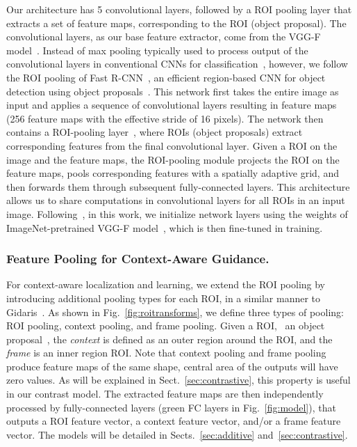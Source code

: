 \documentclass[runningheads]{llncs}
\begin{document}
Our architecture has 5 convolutional layers, followed by a ROI pooling
layer that extracts a set of feature maps, corresponding to the ROI (object
proposal). The convolutional layers, as our base feature extractor, come from
the VGG-F model~\cite{Chatfield14}. 
Instead of max pooling typically used to process output of the convolutional layers in conventional
CNNs for classification~\cite{Krizhevsky:2012wl,Oquab:2015us}, however, we
follow the ROI pooling of Fast R-CNN~\cite{Girshick_2015_ICCV}, an efficient
region-based CNN for object detection using object
proposals~\cite{uijlings2013selective}. This network first takes the
entire image as input and applies a sequence of convolutional layers resulting in feature maps (256 feature maps with the effective stride of 16 pixels). The network then contains a ROI-pooling
layer~\cite{He:2014wg}, where ROIs (object proposals) extract corresponding
features from the final convolutional layer. Given a ROI on the image and the
feature maps, the ROI-pooling module projects the ROI on the feature maps, pools
corresponding features with a spatially adaptive grid, and then forwards
them through subsequent fully-connected layers. This architecture allows us to
share computations in convolutional layers for all ROIs in an input image.
Following~\cite{Bilen:2015uo}, in this work, we initialize network layers using the weights of 
ImageNet-pretrained VGG-F model~\cite{Chatfield14}, which is then fine-tuned in training.

\subsubsection{Feature Pooling for Context-Aware Guidance.} For context-aware localization and
learning, we extend the ROI pooling by introducing additional pooling types 
for each ROI, in a similar manner to Gidaris~\etal\cite{Gidaris:2015cx}. 
As shown in Fig.~\ref{fig:roitransforms}, 
we define three types of pooling: ROI pooling, context pooling, and frame pooling. 
Given a ROI, \ie ~an object proposal~\cite{uijlings2013selective}, 
the {\it context} is defined as an outer region around the ROI, and the {\it frame} is an inner region ROI. Note that context pooling and frame pooling produce feature maps of the same shape, \ie central area of the outputs will have zero values. As will be explained in Sect.~\ref{sec:contrastive}, this property is useful in our contrast model.
The extracted feature maps are then independently
processed by fully-connected layers (green FC layers in Fig.~\ref{fig:model}), that outputs a ROI feature vector, a context feature vector, and/or a frame feature vector.   
The models will be detailed in Sects.~\ref{sec:additive}
and~\ref{sec:contrastive}. 
\end{document}
